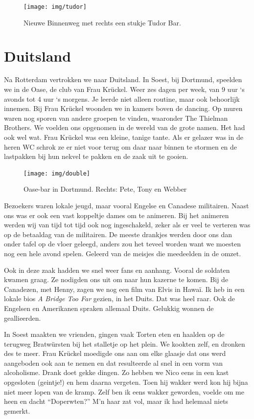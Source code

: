 \documentclass[10pt,twoside, openright]{memoir}
\begin{document}
\begin{figure}
\texttt{[image: img/tudor]}
\caption*{\footnotesize Nieuwe Binnenweg met rechts een stukje Tudor Bar.}
\end{figure}

\section{Duitsland} %
\label{cha:duitsland}

Na Rotterdam vertrokken we naar Duitsland. In Soest, bij Dortmund, speelden we in de Oase, de club van Frau Krückel. Weer zes dagen per week, van 9 uur `s avonds tot 4 uur `s morgens. Je leerde niet alleen routine, maar ook behoorlijk innemen. Bij Frau Krückel woonden we in kamers boven de dancing. Op muren waren nog sporen van andere groepen te vinden, waaronder The Thielman Brothers. We voelden ons opgenomen in de wereld van de grote namen. Het had ook wel wat. Frau Krückel was een kleine, tanige tante. Als er gelazer was in de heren WC schrok ze er niet voor terug om daar naar binnen te stormen en de lastpakken bij hun nekvel te pakken en de zaak uit te gooien.

\begin{figure}
\texttt{[image: img/double]}
\caption*{\footnotesize Oase-bar in Dortmund. Rechts: Pete, Tony en Webber}
\end{figure}

Bezoekers waren lokale jeugd, maar vooral Engelse en Canadese militairen. Naast ons was er ook een vast koppeltje dames om te animeren. Bij het animeren werden wij van tijd tot tijd ook nog ingeschakeld, zeker als er veel te verteren was op de betaaldag van de militairen. De meeste drankjes werden door ons dan onder tafel op de vloer geleegd, anders zou het teveel worden want we moesten nog een hele avond spelen. Geleerd van de meisjes die meedeelden in de omzet. 

Ook in deze zaak hadden we snel weer fans en aanhang. Vooral de soldaten kwamen graag. Ze nodigden ons uit om naar hun kazerne te komen. Bij de Canadezen, met Henny, zagen we nog een film van Elvis in Hawaï. Ik heb in een lokale bios \emph{A Bridge Too Far} gezien, in het Duits. Dat was heel raar. Ook de Engelsen en Amerikanen spraken allemaal Duits. Gelukkig wonnen de geallieerden.

In Soest maakten we vrienden, gingen vaak Torten eten en haalden op de terugweg Bratwürsten bij het stalletje op het plein. We kookten zelf, en dronken des te meer. Frau Krückel moedigde ons aan om elke glaasje dat ons werd aangeboden ook aan te nemen en dat resulteerde al snel in een vorm van alcoholisme. Drank doet gekke dingen. Zo hebben we Nico eens in een kast opgesloten (geintje!) en hem daarna vergeten. Toen hij wakker werd kon hij bijna niet meer lopen van de kramp. Zelf ben ik eens wakker geworden, voelde om me heen en dacht ``Doperwten?'' M’n haar zat vol, maar ik had helemaal niets gemerkt. 
\end{document}
